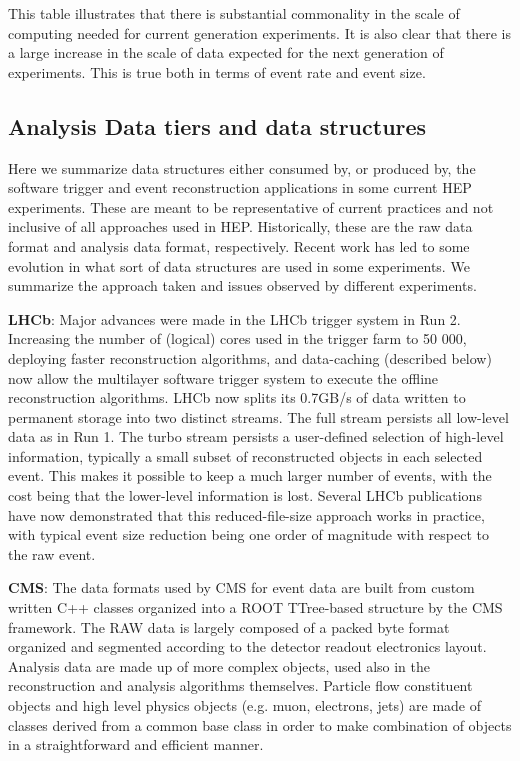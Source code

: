 This table illustrates that there is substantial commonality in the scale of computing needed for current generation experiments. It is also clear that there is a large increase in the scale of data expected for the next generation of experiments. This is true both in terms of event rate and event size.

\subsection{Analysis Data tiers and data structures}
Here we summarize data structures either consumed by, or produced by, the software trigger and event reconstruction applications in some current HEP experiments. These are meant to be representative of current practices and not inclusive of all approaches used in HEP. Historically, these are the raw data format and analysis data format, respectively. Recent work has led to some evolution in what sort of data structures are used in some experiments. We summarize the approach taken and issues observed by different experiments.

\vskip 0.5cm
\noindent
{\bf LHCb}: Major advances were made in the LHCb trigger system in Run 2. Increasing the number of (logical) cores used in the trigger farm to 50 000, deploying faster reconstruction algorithms, and data-caching (described below) now allow the multilayer software trigger system to execute the offline reconstruction algorithms. LHCb now splits its 0.7GB/s of data written to permanent storage into two distinct streams. The full stream persists all low-level data as in Run 1. The turbo stream persists a user-defined selection of high-level information, typically a small subset of reconstructed objects in each selected event. This makes it possible to keep a much larger number of events, with the cost being that the lower-level information is lost. Several LHCb publications have now demonstrated that this reduced-file-size approach works in practice, with typical event size reduction being one order of magnitude with respect to the raw event. 

\vskip 0.5cm
\noindent
{\bf CMS}: The data formats used by CMS for event data are built from custom written C++ classes organized into a ROOT TTree-based structure by the CMS framework. The RAW data is largely composed of a packed byte format organized and segmented according to the detector readout electronics layout. Analysis data are made up of more complex objects, used also in the reconstruction and analysis algorithms themselves. Particle flow constituent objects and high level physics objects (e.g. muon, electrons, jets) are made of classes derived from a common base class in order to make combination of objects in a straightforward and efficient manner.

